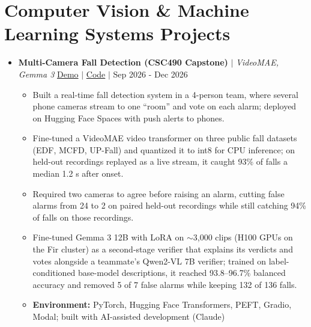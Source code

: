 \documentclass{article}
\begin{document}
\section*{Computer Vision \& Machine Learning Systems Projects}
\begin{itemize}

\item[] \textbf{Multi-Camera Fall Detection (CSC490 Capstone)} $\mid$ \textit{VideoMAE, Gemma 3} \hfill \href{https://youtu.be/GD_KssecW6U}{Demo} $\mid$ \href{https://github.com/soloadio/CSC490-Fall-Detection-Capstone-Project}{Code} $\mid$ Sep 2026 - Dec 2026
  \begin{itemize}
    \item Built a real-time fall detection system in a 4-person team, where several phone cameras stream to one ``room'' and vote on each alarm; deployed on Hugging Face Spaces with push alerts to phones.
    \item Fine-tuned a VideoMAE video transformer on three public fall datasets (EDF, MCFD, UP-Fall) and quantized it to int8 for CPU inference; on held-out recordings replayed as a live stream, it caught 93\% of falls a median 1.2 s after onset.
    \item Required two cameras to agree before raising an alarm, cutting false alarms from 24 to 2 on paired held-out recordings while still catching 94\% of falls on those recordings.
    \item Fine-tuned Gemma 3 12B with LoRA on ${\sim}$3,000 clips (H100 GPUs on the Fir cluster) as a second-stage verifier that explains its verdicts and votes alongside a teammate's Qwen2-VL 7B verifier; trained on label-conditioned base-model descriptions, it reached 93.8--96.7\% balanced accuracy and removed 5 of 7 false alarms while keeping 132 of 136 falls.
    \item \textbf{Environment:} PyTorch, Hugging Face Transformers, PEFT, Gradio, Modal; built with AI-assisted development (Claude)
  \end{itemize}
  \vspace{3px}


\end{itemize}
\end{document}
